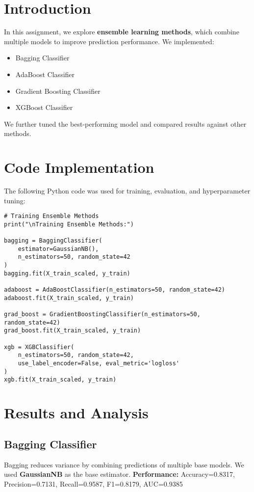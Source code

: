 \documentclass[12pt]{article}
\begin{document}
\section{Introduction}
In this assignment, we explore \textbf{ensemble learning methods}, which combine multiple models to improve prediction performance. We implemented:
\begin{itemize}
    \item Bagging Classifier
    \item AdaBoost Classifier
    \item Gradient Boosting Classifier
    \item XGBoost Classifier
\end{itemize}
We further tuned the best-performing model and compared results against other methods.

\section{Code Implementation}
The following Python code was used for training, evaluation, and hyperparameter tuning:

\begin{lstlisting}
# Training Ensemble Methods
print("\nTraining Ensemble Methods:")

bagging = BaggingClassifier(
    estimator=GaussianNB(),
    n_estimators=50, random_state=42
)
bagging.fit(X_train_scaled, y_train)

adaboost = AdaBoostClassifier(n_estimators=50, random_state=42)
adaboost.fit(X_train_scaled, y_train)

grad_boost = GradientBoostingClassifier(n_estimators=50, random_state=42)
grad_boost.fit(X_train_scaled, y_train)

xgb = XGBClassifier(
    n_estimators=50, random_state=42,
    use_label_encoder=False, eval_metric='logloss'
)
xgb.fit(X_train_scaled, y_train)
\end{lstlisting}

\section{Results and Analysis}

\subsection{Bagging Classifier}
Bagging reduces variance by combining predictions of multiple base models. We used \textbf{GaussianNB} as the base estimator.  
\newline
\textbf{Performance:}  
Accuracy=0.8317, Precision=0.7131, Recall=0.9587, F1=0.8179, AUC=0.9385  
\end{document}

